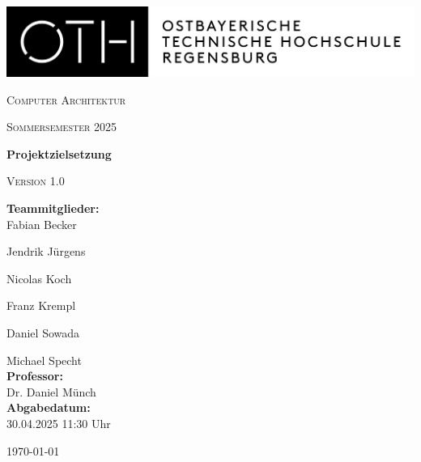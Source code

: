 \begin{titlepage}
    \begin{flushleft}
        \includegraphics[width=.6\textwidth]{./images/oth.png}
    \end{flushleft}

    \vspace*{4cm} %

    \centering
    {\scshape\Large Computer Architektur \par}
    \vspace{0.5cm}
    {\scshape Sommersemester 2025 \par}
    \vspace{0.5cm}
    {\huge\bfseries Projektzielsetzung \par}
    \vspace{0.5cm}
    {\scshape Version 1.0 \par}
    \vspace{4cm}

    \begin{flushleft}
        \large
        \textbf{Teammitglieder:} \\
        Fabian Becker

        Jendrik Jürgens
        
        Nicolas Koch
        
        Franz Krempl
        
        Daniel Sowada
        
        Michael Specht \\
        \vspace{0.5cm}
        \textbf{Professor:} \\
        Dr. Daniel Münch \\
        \vspace{0.5cm}
        \textbf{Abgabedatum:} \\
        30.04.2025 11:30 Uhr \\
    \end{flushleft}

    \vfill
    \centering
    {\large \today\par}
\end{titlepage}
